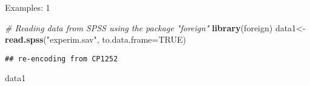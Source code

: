 \documentclass[
  ignorenonframetext,
]{beamer}
\newenvironment{Shaded}{\begin{snugshade}}{\end{snugshade}}
\newcommand{\CommentTok}[1]{\textcolor[rgb]{0.56,0.35,0.01}{\textit{#1}}}
\newcommand{\DataTypeTok}[1]{\textcolor[rgb]{0.13,0.29,0.53}{#1}}
\newcommand{\KeywordTok}[1]{\textcolor[rgb]{0.13,0.29,0.53}{\textbf{#1}}}
\newcommand{\NormalTok}[1]{#1}
\newcommand{\OtherTok}[1]{\textcolor[rgb]{0.56,0.35,0.01}{#1}}
\newcommand{\StringTok}[1]{\textcolor[rgb]{0.31,0.60,0.02}{#1}}
\begin{document}
\begin{frame}[fragile]{Examples: 1}
\protect\hypertarget{examples-1}{}

\begin{Shaded}
\begin{Highlighting}[]
\CommentTok{# Reading data from SPSS using the package "foreign"}
\KeywordTok{library}\NormalTok{(foreign)}
\NormalTok{data1<-}\KeywordTok{read.spss}\NormalTok{(}\StringTok{"experim.sav"}\NormalTok{, }\DataTypeTok{to.data.frame=}\OtherTok{TRUE}\NormalTok{)}
\end{Highlighting}
\end{Shaded}

\begin{verbatim}
## re-encoding from CP1252
\end{verbatim}

\begin{Shaded}
\begin{Highlighting}[]
\NormalTok{data1}
\end{Highlighting}
\end{Shaded}


\end{frame}
\end{document}
